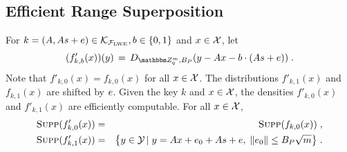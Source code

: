 \subsection{Efficient Range Superposition} 
For $k=(\*A,\*A\*s+\*e)\in \mathcal{K}_{\mathcal{F}_{\lwe}}, b\in\{0,1\}$ and $x\in \mathcal{X}$,
let
\begin{equation}\label{eq:defprobdensitymodified}
    (f'_{k,b}(x))(y) \,=\, D_{\mZ_q^m,B_P}(y - \*Ax - b\cdot (\*A\*s + \*e))\;.
\end{equation}
Note that $f'_{k,0}(x) = f_{k,0}(x)$ for all $x\in \mathcal{X}$. The distributions $f'_{k,1}(x)$ and $f_{k,1}(x)$ are shifted by $\*e$. Given the key $k$ and $x\in\mathcal{X}$, the densities $f'_{k,0}(x)$ and $f'_{k,1}(x)$ are efficiently computable. For all $x\in \mathcal{X}$,
\begin{eqnarray}
\supp(f'_{k,0}(x)) &=& \supp(f_{k,0}(x))\;,\\
\supp(f'_{k,1}(x)) &=& \big\{y \in \sY\, |\; y = \*Ax + \*e_0 + \*A\*s + \*e, \; \|\*e_0\|\leq B_P\sqrt{m}\big\}\;.\label{eq:fprime1}
\end{eqnarray}
